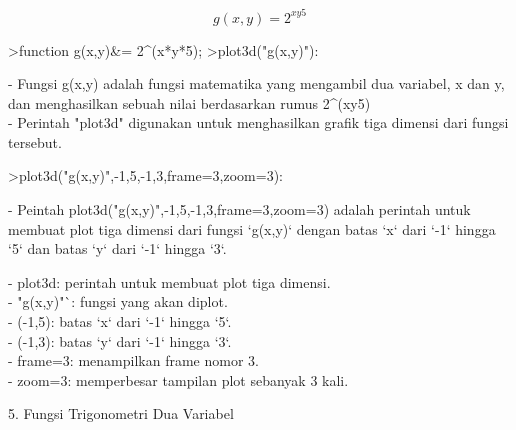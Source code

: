 \documentclass{article}
\begin{document}
\begin{eulernotebook}
\begin{eulercomment}
\begin{eulercomment}
\begin{eulercomment}
\begin{eulercomment}
\begin{eulercomment}
\end{eulercomment}
\begin{eulerformula}
\[
g(x,y) = 2^{xy5}
\]
\end{eulerformula}
\begin{eulerprompt}
>function g(x,y)&= 2^(x*y*5);
>plot3d("g(x,y)"):
\end{eulerprompt}
\begin{eulercomment}
- Fungsi g(x,y) adalah fungsi matematika yang mengambil dua variabel,
x dan y, dan menghasilkan sebuah nilai berdasarkan rumus 2\textasciicircum{}(xy5)\\
- Perintah "plot3d" digunakan untuk menghasilkan grafik tiga dimensi
dari fungsi tersebut.
\end{eulercomment}
\begin{eulerprompt}
>plot3d("g(x,y)",-1,5,-1,3,frame=3,zoom=3):
\end{eulerprompt}
\begin{eulercomment}
- Peintah plot3d("g(x,y)",-1,5,-1,3,frame=3,zoom=3) adalah perintah
untuk membuat plot tiga dimensi dari fungsi `g(x,y)` dengan batas `x`
dari `-1` hingga `5` dan batas `y` dari `-1` hingga `3`.

- plot3d: perintah untuk membuat plot tiga dimensi.\\
- "g(x,y)"`: fungsi yang akan diplot.\\
- (-1,5): batas `x` dari `-1` hingga `5`.\\
- (-1,3): batas `y` dari `-1` hingga `3`.\\
- frame=3: menampilkan frame nomor 3.\\
- zoom=3: memperbesar tampilan plot sebanyak 3 kali.

\end{eulercomment}
\eulersubheading{}
\begin{eulercomment}
5. Fungsi Trigonometri Dua Variabel


\end{eulercomment}
\end{eulercomment}
\end{eulercomment}
\end{eulercomment}
\end{eulercomment}
\end{eulernotebook}
\end{document}
